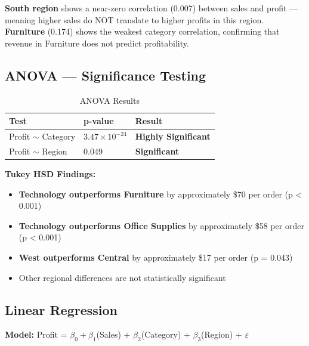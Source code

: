 \documentclass[11pt,a4paper]{article}
\begin{document}
\begin{tcolorbox}[
    colback=warningred!5,
    colframe=warningred!60,
    title=\textbf{Statistical Warning},
    fonttitle=\bfseries,
    arc=6pt
]
\textbf{South region} shows a near-zero correlation (0.007) between sales and profit — meaning higher sales do NOT translate to higher profits in this region. \textbf{Furniture} (0.174) shows the weakest category correlation, confirming that revenue in Furniture does not predict profitability.
\end{tcolorbox}

\subsection{ANOVA — Significance Testing}

\begin{table}[H]
\centering
\begin{tabular}{@{}p{5cm} p{3cm} p{3cm}@{}}
\toprule
\rowcolor{primary!10}
\textbf{Test} & \textbf{p-value} & \textbf{Result} \\
\midrule
Profit $\sim$ Category & $3.47 \times 10^{-24}$ & \textcolor{profitgreen}{\textbf{Highly Significant}} \\
Profit $\sim$ Region & 0.049 & \textcolor{profitgreen}{\textbf{Significant}} \\
\bottomrule
\end{tabular}
\caption{ANOVA Results}
\end{table}

\textbf{Tukey HSD Findings:}
\begin{itemize}[leftmargin=*]
    \item \textbf{Technology outperforms Furniture} by approximately \$70 per order (p < 0.001)
    \item \textbf{Technology outperforms Office Supplies} by approximately \$58 per order (p < 0.001)
    \item \textbf{West outperforms Central} by approximately \$17 per order (p = 0.043)
    \item Other regional differences are not statistically significant
\end{itemize}

\subsection{Linear Regression}

\textbf{Model:} Profit = $\beta_0 + \beta_1$(Sales) + $\beta_2$(Category) + $\beta_3$(Region) + $\varepsilon$
\end{document}
